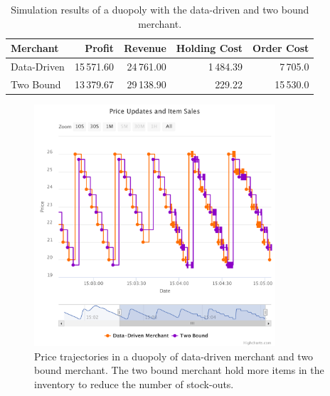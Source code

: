 \begin{table}[t]
	\centering
	\begin{tabular}{lrrrr}
		\toprule
		Merchant & Profit & Revenue & Holding Cost & Order Cost \\
		\midrule
		Data-Driven & 15\,571.60 & 24\,761.00 & 1\,484.39 & 7\,705.0 \\
		Two Bound & 13\,379.67 & 29\,138.90 & 229.22 & 15\,530.0 \\
		\bottomrule
	\end{tabular}
	\caption{Simulation results of a duopoly with the data-driven and two bound merchant.}
	\label{tab:duopoly_bound}
\end{table}


\begin{figure}[t]
	\centering
	\includegraphics[width=0.8\textwidth]{figures/duopoly_bound_prices_2}
	\caption{Price trajectories in a duopoly of data-driven merchant and two bound merchant. The two bound merchant hold more items in the inventory to reduce the number of stock-outs.}
	\label{fig:duopoly_bound_prices_2}
\end{figure}

